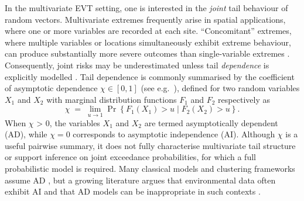 \documentclass[
  12pt]{article}
\begin{document}
In the multivariate EVT setting, one is interested in the \emph{joint} tail behaviour of random vectors.
Multivariate extremes frequently arise in spatial applications, where one or more variables are recorded at each site. 
``Concomitant'' extremes, where multiple variables or locations simultaneously exhibit extreme behaviour, can produce substantially more severe outcomes than single-variable extremes \citep{zscheischler2018future, bevacqua2021guidelines, Rohrbeck2021, Sando2022}.
Consequently, joint risks may be underestimated unless tail \emph{dependence} is explicitly modelled \citep{Zhang2024}. 
Tail dependence is commonly summarised by the coefficient of asymptotic dependence \(\chi\in[0,1]\) (see e.g.\ \citet{Coles1999}), defined for two random variables $X_1$ and $X_2$ with marginal distribution functions $F_1$ and $F_2$ respectively as
\[
  \chi \;=\; \lim_{u\to 1}\Pr\left\{F_1(X_1)>u \mid F_2(X_2)>u\right\}.
\]
When $\chi$ > 0, the variables $X_1$ and $X_2$ are termed asymptotically dependent (AD), while $\chi=0$ corresponds to asymptotic independence (AI).
Although \(\chi\) is a useful pairwise summary, it does not fully characterise multivariate tail structure or support inference on joint exceedance probabilities, for which a full probabilistic model is required. 
Many classical models and clustering frameworks assume AD \citep{Vignotto2021,Boulin2025}, but a growing literature argues that environmental data often exhibit AI and that AD models can be inappropriate in such contexts \citep{Opitz2016,Dawkins2018,Huser2024}. 
\end{document}
